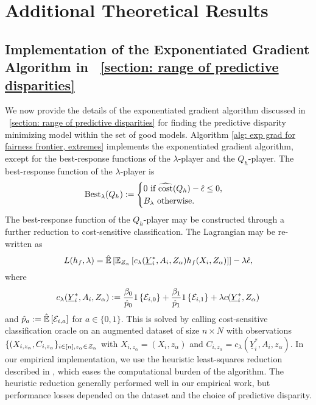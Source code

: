 \documentclass{article}
\begin{document}
\clearpage
\singlespacing
  
 

\clearpage
\newpage
\appendix

\section{Additional Theoretical Results}\label{section: additional theoretical results}

\subsection{Implementation of the Exponentiated Gradient Algorithm in \textsection~\ref{section: range of predictive disparities}}\label{sec: exp grad for range}
We now provide the details of the exponentiated gradient algorithm discussed in \textsection~\ref{section: range of predictive disparities} for finding the predictive disparity minimizing model within the set of good models. Algorithm \ref{alg: exp grad for fairness frontier, extremes} implements the exponentiated gradient algorithm, except for the best-response functions of the $\lambda$-player and the $Q_h$-player. The best-response function of the $\lambda$-player is
    \begin{equation}
        \operatorname{Best}_{\lambda}(Q_h) := \begin{cases}
            0 \mbox{ if } \widehat{\operatorname{cost}}(Q_h) - \hat{\epsilon} \leq 0, \\
            B_\lambda \mbox{ otherwise}.
        \end{cases}
    \end{equation}
The best-response function of the $Q_h$-player may be constructed through a further reduction to cost-sensitive classification. The Lagrangian may be re-written as 
    \begin{equation}
        L(h_f, \lambda) = \hat{\mathbb{E}}\left[ \mathbb{E}_{Z_\alpha}\left[ c_\lambda(\underline{Y}^*_i, A_i, Z_\alpha) h_f(X_i, Z_\alpha) \right] \right] - \lambda \hat{\epsilon},
    \end{equation}
where 
\begin{eqnarray} \label{equation: lambda cost for base case}
 c_\lambda(\underline{Y}^*_i, A_i, Z_\alpha) := \frac{\beta_0}{\hat{p}_0} 1\left\{ \mathcal{E}_{i,0} \right\} + \frac{\beta_1}{\hat{p}_1} 1\left\{ \mathcal{E}_{i,1} \right\} + \lambda c(\underline{Y}^*_i, Z_\alpha)
\end{eqnarray}
and $\hat{p}_a := \hat{\mathbb{E}}\left[ \mathcal{E}_{i,a} \right]$ for $a \in \{0, 1\}$. This is solved by calling cost-sensitive classification oracle on an augmented dataset of size $n \times N$ with observations $\{(X_{i, z_\alpha}, C_{i, z_\alpha}\}_{i \in [n], z_\alpha \in \mathcal{Z}_\alpha}$ with $X_{i, z_\alpha} = (X_i, z_\alpha)$ and $C_{i, z_\alpha} = c_\lambda(\underline{Y}^*_i, A_i, z_\alpha)$. In our empirical implementation, we use the heuristic least-squares reduction described in \cite{AgarwalEtAl(19)-FairRegression}, which eases the computational burden of the algorithm. The heuristic reduction generally performed well in our empirical work, but performance losses depended on the dataset and the choice of predictive disparity.
\end{document}
